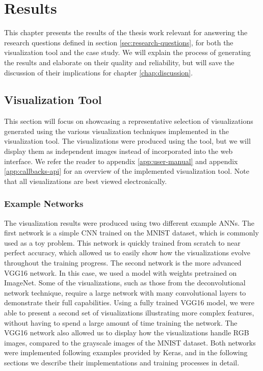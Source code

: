 
\chapter{Results} \label{chap:results}

This chapter presents the results of the thesis work relevant for answering the research questions defined in section \ref{sec:research-questions}, for both the visualization tool and the case study. We will explain the process of generating the results and elaborate on their quality and reliability, but will save the discussion of their implications for chapter \ref{chap:discussion}.

\section{Visualization Tool} \label{results-chapter-vis}

This section will focus on showcasing a representative selection of visualizations generated using the various visualization techniques implemented in the visualization tool. The visualizations were produced using the tool, but we will display them as independent images instead of incorporated into the web interface. We refer the reader to appendix \ref{app:user-manual} and appendix \ref{app:callbacks-api} for an overview of the implemented visualization tool. Note that all visualizations are best viewed electronically.


\subsection{Example Networks} \label{example-networks}

The visualization results were produced using two different example ANNs. The first network is a simple CNN trained on the MNIST dataset, which is commonly used as a toy problem. This network is quickly trained from scratch to near perfect accuracy, which allowed us to easily show how the visualizations evolve throughout the training progress. The second network is the more advanced VGG16 network. In this case, we used a model with weights pretrained on ImageNet. Some of the visualizations, such as those from the deconvolutional network technique, require a large network with many convolutional layers to demonstrate their full capabilities. Using a fully trained VGG16 model, we were able to present a second set of visualizations illustrating more complex features, without having to spend a large amount of time training the network. The VGG16 network also allowed us to display how the visualizations handle RGB images, compared to the grayscale images of the MNIST dataset. Both networks were implemented following examples provided by Keras, and in the following sections we describe their implementations and training processes in detail.\\

